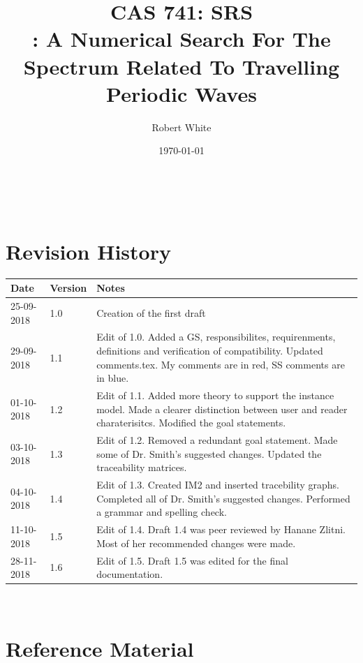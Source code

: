 \documentclass[12pt]{article}
\begin{document}
\title{CAS 741: SRS \\ \progname : A Numerical Search For The Spectrum Related 
To 
Travelling 
Periodic Waves} 
\author{Robert White}
\date{\today}
	
\maketitle

~\newpage


\section{Revision History}

\begin{tabularx}{\textwidth}{p{3cm}p{2cm}X}
\toprule {\bf Date} & {\bf Version} & {\bf Notes}\\
\midrule
25-09-2018 & 1.0 & Creation of the first draft\\
29-09-2018 & 1.1 & Edit of 1.0. Added a GS, responsibilites, requirenments, 
definitions and verification of compatibility. Updated comments.tex. My 
comments are in red, SS comments are in blue.\\ 
01-10-2018 & 1.2 & Edit of 1.1. Added more theory to support the instance 
model. Made a clearer distinction between user and reader charaterisitcs. 
Modified the goal statements.  \\ 
03-10-2018 & 1.3 & Edit of 1.2. Removed a redundant goal statement. Made some 
of Dr. 
Smith's suggested changes. Updated the traceability matrices.  \\
04-10-2018 & 1.4 & Edit of 1.3. Created IM2 and inserted tracebility graphs. 
Completed all of Dr. Smith's suggested changes. Performed a grammar and 
spelling check.\\ 
11-10-2018 & 1.5& Edit of 1.4. Draft 1.4 was peer reviewed by Hanane Zlitni. 
Most of her recommended changes were made. \\
28-11-2018& 1.6& Edit of 1.5. Draft 1.5 was edited for the final 
documentation.\\
\bottomrule
\end{tabularx}

~\newpage

\section{Reference Material}
\end{document}
